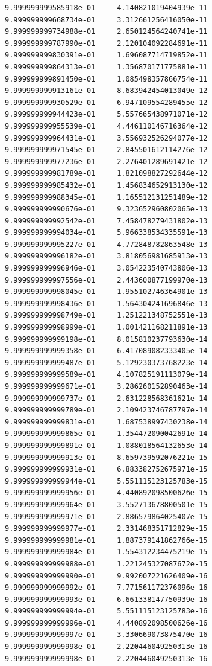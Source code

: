 \documentclass[a4paper,12pt]{article}
\begin{document}
\begin{enumerate}[label = \arabic*.]
\begin{enumerate}[label = \roman*.]
\begin{verbatim}
9.999999999585918e-01     4.140821019404939e-11
9.999999999668734e-01     3.312661256416050e-11
9.999999999734988e-01     2.650124564240741e-11
9.999999999787990e-01     2.120104092284691e-11
9.999999999830391e-01     1.696087714719852e-11
9.999999999864313e-01     1.356870171775881e-11
9.999999999891450e-01     1.085498357866754e-11
9.999999999913161e-01     8.683942454013049e-12
9.999999999930529e-01     6.947109554289455e-12
9.999999999944423e-01     5.557665438971071e-12
9.999999999955539e-01     4.446110146716364e-12
9.999999999964431e-01     3.556932526294077e-12
9.999999999971545e-01     2.845501612114276e-12
9.999999999977236e-01     2.276401289691421e-12
9.999999999981789e-01     1.821098827292644e-12
9.999999999985432e-01     1.456834652913130e-12
9.999999999988345e-01     1.165512131251489e-12
9.999999999990676e-01     9.323652960802065e-13
9.999999999992542e-01     7.458478279431802e-13
9.999999999994034e-01     5.966338534335591e-13
9.999999999995227e-01     4.772848782863548e-13
9.999999999996182e-01     3.818056981685913e-13
9.999999999996946e-01     3.054223540743806e-13
9.999999999997556e-01     2.443600877199970e-13
9.999999999998045e-01     1.955102746364901e-13
9.999999999998436e-01     1.564304241696846e-13
9.999999999998749e-01     1.251221348752551e-13
9.999999999998999e-01     1.001421168211891e-13
9.999999999999198e-01     8.015810237793630e-14
9.999999999999358e-01     6.417089082333405e-14
9.999999999999487e-01     5.129230373768223e-14
9.999999999999589e-01     4.107825191113079e-14
9.999999999999671e-01     3.286260152890463e-14
9.999999999999737e-01     2.631228568361621e-14
9.999999999999789e-01     2.109423746787797e-14
9.999999999999831e-01     1.687538997430238e-14
9.999999999999865e-01     1.354472090042691e-14
9.999999999999891e-01     1.088018564132653e-14
9.999999999999913e-01     8.659739592076221e-15
9.999999999999931e-01     6.883382752675971e-15
9.999999999999944e-01     5.551115123125783e-15
9.999999999999956e-01     4.440892098500626e-15
9.999999999999964e-01     3.552713678800501e-15
9.999999999999971e-01     2.886579864025407e-15
9.999999999999977e-01     2.331468351712829e-15
9.999999999999981e-01     1.887379141862766e-15
9.999999999999984e-01     1.554312234475219e-15
9.999999999999988e-01     1.221245327087672e-15
9.999999999999990e-01     9.992007221626409e-16
9.999999999999992e-01     7.771561172376096e-16
9.999999999999993e-01     6.661338147750939e-16
9.999999999999994e-01     5.551115123125783e-16
9.999999999999996e-01     4.440892098500626e-16
9.999999999999997e-01     3.330669073875470e-16
9.999999999999998e-01     2.220446049250313e-16
9.999999999999998e-01     2.220446049250313e-16
             \end{verbatim}
            

\end{enumerate}
\end{enumerate}
\end{document}

